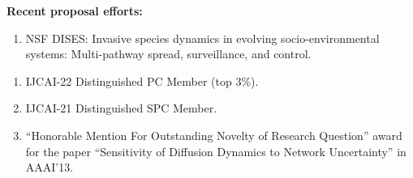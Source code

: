 \documentclass[margin,10pt]{res} %
\begin{document}
\begin{resume}
{\noindent
\textbf{Recent proposal efforts:}\\
\begin{enumerate}[$\circ$]
\item NSF DISES: Invasive species dynamics in evolving socio-environmental
systems: Multi-pathway spread, surveillance, and control.
\end{enumerate}
}

\iftoggle{compact}{
\section{\textnormal{\textsc{Selected awards}}}
}{
\section{\textnormal{\textsc{Awards}}}
}
\begin{enumerate}[$\circ$]
    \item IJCAI-22 Distinguished PC Member (top 3\%).
    \item IJCAI-21 Distinguished SPC Member.
\iftoggle{compact}{}{
   \item ``DSFEW Early Career Researchers Travel Fund'', KDD 2016.
   }
\item ``Honorable Mention For Outstanding Novelty of Research
Question'' award for the paper ``Sensitivity of Diffusion Dynamics to
Network Uncertainty'' in AAAI'13.
\iftoggle{compact}{}{
\item Infosys Fellow: awarded to select
PhD candidates in IISc by Infosys Technologies Ltd. 
\item Secured All India Rank of 34 in GATE 2000 (EC), a national level
entrance exam for post graduate studies.
\item Ranked 7th in Bangalore University in Telecommunication Engg. (Year 2000).
   }
\end{enumerate}

\end{resume}
\end{document}
